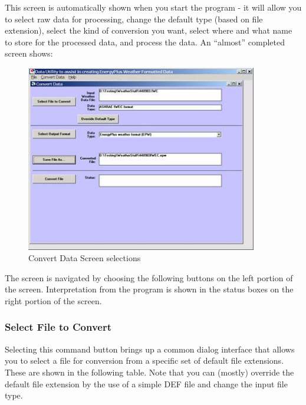 This screen is automatically shown when you start the program - it will allow you to select raw data for processing, change the default type (based on file extension), select the kind of conversion you want, select where and what name to store for the processed data, and process the data. An ``almost'' completed screen shows:

\begin{figure}[hbtp] %
\centering
\includegraphics[width=0.9\textwidth, height=0.9\textheight, keepaspectratio=true]{media/image003.jpg}
\caption{Convert Data Screen selections \protect \label{fig:convert-data-screen-selections}}
\end{figure}

The screen is navigated by choosing the following buttons on the left portion of the screen. Interpretation from the program is shown in the status boxes on the right portion of the screen.

\subsubsection{Select File to Convert}\label{select-file-to-convert}

Selecting this command button brings up a common dialog interface that allows you to select a file for conversion from a specific set of default file extensions. These are shown in the following table. Note that you can (mostly) override the default file extension by the use of a simple DEF file and change the input file type.

